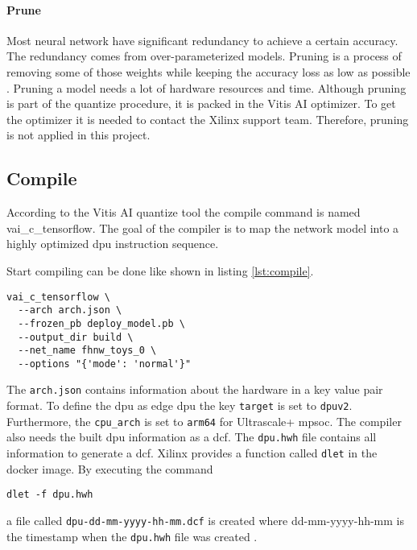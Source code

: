 \paragraph{Prune}
Most neural network have significant redundancy to achieve a certain accuracy.
The redundancy comes from over-parameterized models.
Pruning is a process of removing some of those weights while keeping the accuracy loss as low as possible \cite{pruning_overview}.
Pruning a model needs a lot of hardware resources and time.
Although pruning is part of the quantize procedure, it is packed in the Vitis AI optimizer.
To get the optimizer it is needed to contact the Xilinx support team.
Therefore, pruning is not applied in this project.

\subsection{Compile}
\label{subsec:embedded_platform:model_deployment:compile}
According to the Vitis AI quantize tool the compile command is named vai\_c\_tensorflow.
The goal of the compiler is to map the network model into a highly optimized \acrshort{dpu} instruction sequence.

Start compiling can be done like shown in listing \ref{lst:compile}.

\begin{lstlisting}[style=bash, caption={Compile command}, label=lst:compile]
  vai_c_tensorflow \
  --arch arch.json \
  --frozen_pb deploy_model.pb \
  --output_dir build \
  --net_name fhnw_toys_0 \
  --options "{'mode': 'normal'}"
\end{lstlisting}

The \texttt{arch.json} contains information about the hardware in a key value pair format.
To define the \acrshort{dpu} as edge \acrshort{dpu} the key \texttt{target} is set to \texttt{dpuv2}.
Furthermore, the \texttt{cpu\_arch} is set to \texttt{arm64} for Ultrascale+ \acrshort{mpsoc}.
The compiler also needs the built \acrshort{dpu} information as a \acrfull{dcf}.
The \texttt{dpu.hwh} file contains all information to generate a \acrshort{dcf}.
Xilinx provides a function called \texttt{dlet} in the docker image.
By executing the command
\begin{lstlisting}[style=bash, caption={}, label=lst:dlet]
  dlet -f dpu.hwh
\end{lstlisting}
a file called \texttt{dpu-dd-mm-yyyy-hh-mm.dcf} is created where dd-mm-yyyy-hh-mm is the timestamp when the \texttt{dpu.hwh} file was created \cite{vitis_ai_user_guide}.

